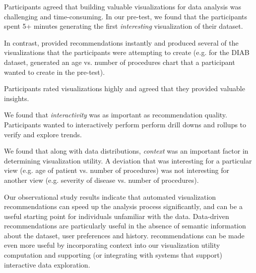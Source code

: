 \begin{denselist}
\item Participants agreed that building valuable visualizations for data analysis was challenging and time-consuming. In our pre-test, we found that the participants spent 5+ minutes generating the first {\it interesting} visualization of their dataset.
\item In contrast, \SeeDB provided recommendations instantly and produced several of the visualizations that the participants were attempting to create (e.g. for the DIAB dataset, \SeeDB generated an age vs. number of procedures chart that a participant wanted to create in the pre-test).
\item Participants rated \SeeDB visualizations highly and agreed that they provided valuable insights. 
\item We found that {\it interactivity} was as important as recommendation quality. Participants wanted to interactively perform perform drill downs and rollups to verify and explore trends.
\item We found that along with data distributions, {\it context} was an important factor in determining visualization utility. A deviation that was interesting for a particular view (e.g. age of patient vs. number of procedures) was not interesting for another view (e.g. severity of disease vs. number of procedures). 
\end{denselist}

Our observational study results indicate that automated visualization recommendations can speed up the analysis process significantly, and can be a useful starting point for individuals unfamiliar with the data.
Data-driven recommendations are particularly useful in the absence of semantic information about the dataset, user preferences and history.
\SeeDB recommendations can be made even more useful by incorporating context into our visualization utility computation and supporting (or integrating with systems that support) interactive data exploration.


